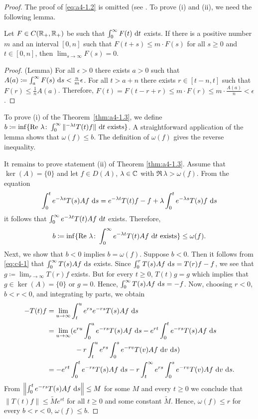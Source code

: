 \begin{proof}  The proof of \eqref{eq:a4-1.2} is omitted (see \citet[p.306]{hillephillips:1957}. 
To prove (i) and (ii), we need the following lemma.
\begin{lemma*}\label{lem:a4-1.3}
Let $F \in C(\mathbb{R}_{+},\mathbb{R}_{+})$ be such that $\int_{0}^{\infty} F(t) \,\mathop{}\!\mathrm{d}{t}$ exists. 
If there is a positive number $m$ and an interval $\left[0,n\right]$ such that $F(t + s) \leq m \cdot F(s)$ for all $s \geq 0$ and $t \in \left[0,n\right]$, then $\lim_{s \to \infty} F(s) = 0$.
\end{lemma*}
\begin{proof}(Lemma)
For all $\epsilon > 0$ there exists $a > 0$ such that $A(a) \coloneqq \int_{a}^{\infty} F(s) \,\mathop{}\!\mathrm{d}{s} < \frac{n}{m}\epsilon$.
For all $t > a+n$ there exists $r \in [t-n,t]$ such that $F(r) \leq \frac{1}{n}A(a)$.
Therefore, $F(t) = F(t-r+r) \leq m \cdot F(r) \leq m \cdot \frac{A(a)}{n} < \epsilon$. 
\end{proof}
To prove (i) of the Theorem~\ref{thm:a4-1.3}, we define $b \coloneqq \inf\{\mathop{}\!\mathrm{Re}\,\,\lambda\colon\int_{0}^{\infty} \|^{-\lambda t} T(t)f\| \,\mathop{}\!\mathrm{d}{t} \text{ exists}\}$. 
A straightforward application of the lemma shows that $\omega(f) \leq b$.
The definition of $\omega(f)$ gives the reverse inequality.

It remains to prove statement (ii) of Theorem \ref{thm:a4-1.3}.
Assume that $\ker(A) = \{0\}$ and let $f \in D(A)$, $\lambda \in \mathbb{C}$ with $\Re\,\lambda > \omega(f)$. 
From the equation
\[
\int_{0}^{t} e^{-\lambda s} T(s)Af \,\mathop{}\!\mathrm{d}{s} = e^{-\lambda t}T(t)f - f + \lambda \int_{0}^{t} e^{-\lambda s} T(s)f \,\mathop{}\!\mathrm{d}{s}
\]
it follows that $\int_{0}^{\infty} e^{-\lambda t} T(t)Af \,\mathop{}\!\mathrm{d}{t}$ exists. 
Therefore, 
\[b \coloneqq \inf\{\mathop{}\!\mathrm{Re}\,\,\lambda\colon\int_{0}^{\infty} e^{-\lambda t}T(t)Af \,\mathop{}\!\mathrm{d}{t} \text{ exists}\} \leq \omega(f).\]
Next, we show that $b < 0$ implies $b = \omega(f)$. 
Suppose $b < 0$. 
Then it follows from \eqref{eq:c4-1} that $\int_{0}^{\infty} T(s)Af \,\mathop{}\!\mathrm{d}{s}$ exists. 
Since $\int_{0}^{r} T(s)Af \,\mathop{}\!\mathrm{d}{s} = T(r)f - f$, we see that $g \coloneqq\lim_{r \to \infty} T(r)f$ exists. 
But for every $t \geq 0$, $T(t)g = g$ which implies that $g \in \ker(A) = \{0\}$ or $g = 0$. 
Hence, $\int_{0}^{\infty} T(s)Af \,\mathop{}\!\mathrm{d}{s} = -f$.
Now, choosing $r < 0$, $b < r < 0$, and integrating by parts, we obtain
\begin{align*}
-T(t)f &= \lim_{u \to \infty} \int_{t}^{u} e^{r s} e^{-r s} T(s)Af \,\ds\\
&= \lim_{u \to \infty} ( e^{ru}\int_0^ue^{-rs} T(s)Af \,\ds - e^{rt}\int_0^te^{-rs} T(s)Af \,\ds\\ 
& \qquad \qquad -r\int_t^u e^{rs}\int_0^s e^{-rv} T(v)Af\,\diff{v} \,\ds
) \\
&= - e^{rt}\int_0^te^{-rs} T(s)Af \,\ds -r\int_t^\infty e^{rs}\int_0^s e^{-rv} T(v)Af\,\diff{v} \,\ds.
\end{align*}
From $\left\|\int_{0}^{t} e^{-r s} T(s)Af \,\mathop{}\!\mathrm{d}{s}\right\| \leq M$ for some $M$ and every $t \geq 0$ we conclude that $\|T(t)f\| \leq \tilde{M}e^{rt}$ for all $t \geq 0$ and some constant $\tilde{M}$.
Hence, $\omega(f) \leq r$ for every $b < r < 0$, \ie $\omega(f) \leq b$.


\end{proof}
